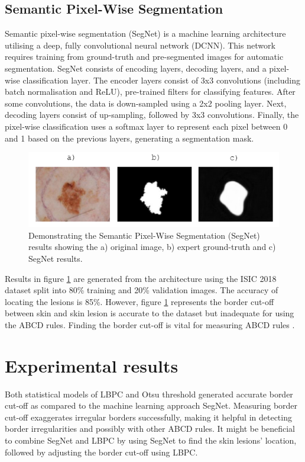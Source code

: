 \subsection{Semantic Pixel-Wise Segmentation}
Semantic pixel-wise segmentation (SegNet) is a machine learning architecture utilising a deep, fully convolutional neural network (DCNN). This network requires training from ground-truth and pre-segmented images for automatic segmentation. SegNet consists of encoding layers, decoding layers, and a pixel-wise classification layer. The encoder layers consist of 3x3 convolutions (including batch normalisation and ReLU), pre-trained filters for classifying features. After some convolutions, the data is down-sampled using a 2x2 pooling layer. Next, decoding layers consist of up-sampling, followed by 3x3 convolutions. Finally, the pixel-wise classification uses a softmax layer to represent each pixel between 0 and 1 based on the previous layers, generating a segmentation mask.

\begin{figure}[hb]
\centering
\includegraphics[scale=1.2]{images/border-seg.png}
\caption{Demonstrating the Semantic Pixel-Wise Segmentation (SegNet) results showing the a) original image, b) expert ground-truth and c) SegNet results.} \label{SegNet2}
\end{figure}

Results in figure \ref{SegNet2} are generated from the architecture using the ISIC 2018 dataset split into 80\% training and 20\% validation images. The accuracy of locating the lesions is 85\%. However, figure \ref{SegNet2} represents the border cut-off between skin and skin lesion is accurate to the dataset but inadequate for using the ABCD rules. Finding the border cut-off is vital for measuring ABCD rules \cite{Pereira2020}.

\section{Experimental results}
Both statistical models of LBPC and Otsu threshold generated accurate border cut-off as compared to the machine learning approach SegNet. Measuring border cut-off exaggerates irregular borders successfully, making it helpful in detecting border irregularities and possibly with other ABCD rules. It might be beneficial to combine SegNet and LBPC by using SegNet to find the skin lesions' location, followed by adjusting the border cut-off using LBPC.


